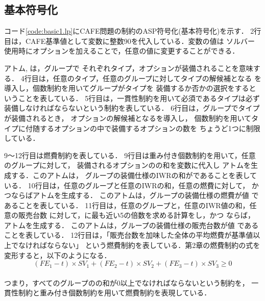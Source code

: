 \subsection{基本符号化}
 

コード\ref{code:basic1.lp}にCAFE問題の制約のASP符号化(基本符号化)を示す．
2行目は，CAFE基準値として変数に整数90を代入している．変数の値は
ソルバー使用時にオプションを加えることで，任意の値に変更することができる．

アトム, は，グループで
それぞれタイプ，オプションが装備されることを意味する．
%
4行目は，任意のタイプ，任意のグループに対してタイプの解候補となる
を導入し，個数制約を用いてグループがタイプを
装備するか否かの選択をするということを表している．
%
5行目は，一貫性制約を用いて必須であるタイプは必ず装備しなければならないという制約を表している．
%
6行目は，グループでタイプが装備されるとき，
オプションの解候補となるを導入し，
個数制約を用いてタイプに付随するオプションの中で装備するオプションの数を
ちょうど1つに制限している．


9〜12行目は燃費制約を表している．
9行目は重み付き個数制約を用いて，任意のグループに対して，
装備されるオプションのの和を変数に代入し
アトムを生成する．このアトムは，
グループの装備仕様のIWRの和がであることを表している．
%
10行目は，任意のグループと任意のIWRの和，任意の燃費に対して，
かつならばアトムを生成する．
このアトムは，グループの装備仕様の燃費が値
であることを表している．
%
11行目は，任意のグループと，任意のIWR値の和，任意の販売台数
に対して，に最も近い5の倍数を求める計算をし，かつ
ならば，アトムを生成する．
このアトムは，グループの装備仕様の販売台数が値
であることを表している．
12行目は，「販売台数を加味した全体の平均燃費が基準値以上でなければならない」
という燃費制約を表している．第2章の燃費制約の式を変形すると，以下のようになる．
\vspace{1em}
\begin{displaymath}
 (FE_{1} - t) \times SV_{1} + (FE_{2} - t) \times SV_{2} + (FE_{3} - t)
 \times SV_{3} \geq 0
\end{displaymath}
\\
つまり，すべてのグループのの和が0以上でなければならないという制約を，
一貫性制約と重み付き個数制約を用いて燃費制約を表現している．




